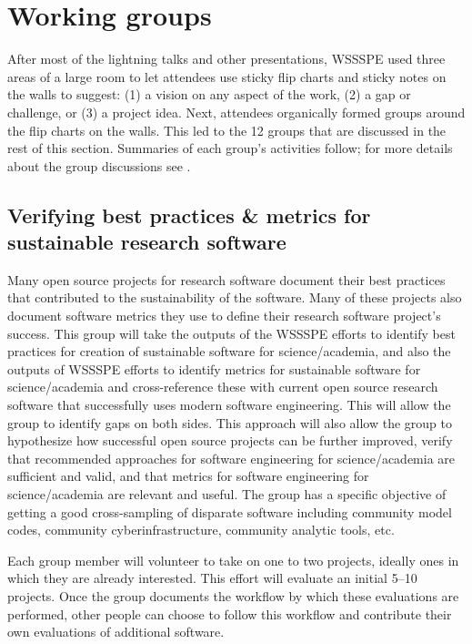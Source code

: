 \documentclass[11pt, oneside]{amsart}
\newcommand{\note}[1]{ {\textcolor{blueish}    { ***Note:      #1 }}}
\begin{document}
\section{Working groups} \label{sec:WGs}

After most of the lightning talks and other presentations, WSSSPE used three areas of a large room to let
attendees use sticky flip charts and sticky notes on the walls to suggest: (1) a vision on any aspect of the work, (2) a gap or challenge, or (3) a project idea.
Next, attendees organically formed groups around the flip charts on the walls.  This led to the 12 groups that are discussed in the rest of this section.
Summaries of each group's activities follow; for more details
about the group discussions see \cite{WSSSPE4-report}.



\subsection{Verifying best practices \& metrics for sustainable research software}
\label{sec:best-practices-sustainable}


Many open source projects for research software document their best practices that
contributed to the sustainability of the software.  Many of these projects also
document software metrics they use to define their research software project's success.
%
This group will take the outputs of the WSSSPE efforts to identify best practices for creation of sustainable software for science/academia, and also the outputs of WSSSPE efforts to identify metrics for sustainable software for science/academia and cross-reference these with current open source research software that successfully uses modern software engineering.  This will allow the group to identify gaps on both sides.  This approach will also allow the group to hypothesize how successful open source projects can be further improved, verify that recommended approaches for software engineering for science/academia are sufficient and valid, and that metrics for software engineering for science/academia are relevant and useful.  The group has a specific objective of getting a good cross-sampling of disparate software including community model codes, community cyberinfrastructure, community analytic tools, etc.

Each group member will volunteer to take on one to two projects, ideally ones in which they are already interested.  This effort will evaluate an initial 5--10 projects.  Once the group documents the workflow by which these evaluations are performed, other people can choose to follow this workflow and contribute their own evaluations of additional software.
\end{document}
